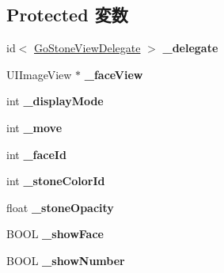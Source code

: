 \subsection*{Protected 変数}
\begin{DoxyCompactItemize}
\item 
\hypertarget{interface_go_stone_view_ad31ada7f49d4137e45959e4fd021582b}{
id$<$ \hyperlink{protocol_go_stone_view_delegate-p}{GoStoneViewDelegate} $>$ {\bfseries \_\-delegate}}
\label{interface_go_stone_view_ad31ada7f49d4137e45959e4fd021582b}

\item 
\hypertarget{interface_go_stone_view_aa993bdd572a42ccd1c099607c808ef6c}{
UIImageView $\ast$ {\bfseries \_\-faceView}}
\label{interface_go_stone_view_aa993bdd572a42ccd1c099607c808ef6c}

\item 
\hypertarget{interface_go_stone_view_ade32c856499a9ca1088ad729dc3a2dfd}{
int {\bfseries \_\-displayMode}}
\label{interface_go_stone_view_ade32c856499a9ca1088ad729dc3a2dfd}

\item 
\hypertarget{interface_go_stone_view_a5fa23d46b02c33eb5c8c924b4e3ae1a1}{
int {\bfseries \_\-move}}
\label{interface_go_stone_view_a5fa23d46b02c33eb5c8c924b4e3ae1a1}

\item 
\hypertarget{interface_go_stone_view_a7ee54d867b18882b40c8b61c72fdbd62}{
int {\bfseries \_\-faceId}}
\label{interface_go_stone_view_a7ee54d867b18882b40c8b61c72fdbd62}

\item 
\hypertarget{interface_go_stone_view_a1ee7f83d28d33220f62a3a9ee3f6b7d3}{
int {\bfseries \_\-stoneColorId}}
\label{interface_go_stone_view_a1ee7f83d28d33220f62a3a9ee3f6b7d3}

\item 
\hypertarget{interface_go_stone_view_a53e412164bdb877f82e3bcea1ff577a4}{
float {\bfseries \_\-stoneOpacity}}
\label{interface_go_stone_view_a53e412164bdb877f82e3bcea1ff577a4}

\item 
\hypertarget{interface_go_stone_view_a82c9855af0848fa92648ba1a0abd5874}{
BOOL {\bfseries \_\-showFace}}
\label{interface_go_stone_view_a82c9855af0848fa92648ba1a0abd5874}

\item 
\hypertarget{interface_go_stone_view_a292e22cf55cd507490bd47318235324b}{
BOOL {\bfseries \_\-showNumber}}
\label{interface_go_stone_view_a292e22cf55cd507490bd47318235324b}


\end{DoxyCompactItemize}
